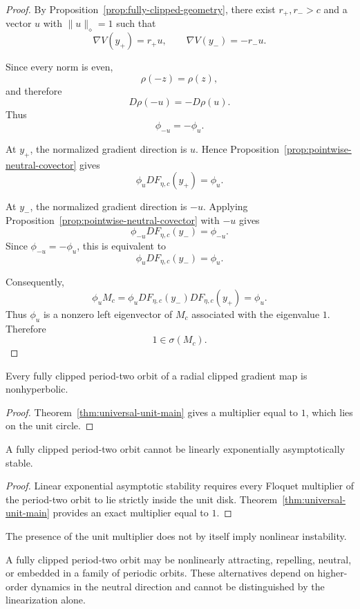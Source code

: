 \begin{proof}
By Proposition~\ref{prop:fully-clipped-geometry}, there exist
$r_+,r_->c$ and a vector $u$ with $\|u\|_\diamond=1$ such that
\[
\nabla V(y_+)=r_+u,
\qquad
\nabla V(y_-)=-r_-u.
\]

Since every norm is even,
\[
\rho(-z)=\rho(z),
\]
and therefore
\[
D\rho(-u)=-D\rho(u).
\]
Thus
\[
\phi_{-u}=-\phi_u.
\]

At $y_+$, the normalized gradient direction is $u$.
Hence Proposition~\ref{prop:pointwise-neutral-covector} gives
\[
\phi_u DF_{\eta,c}(y_+)=\phi_u.
\]

At $y_-$, the normalized gradient direction is $-u$.
Applying Proposition~\ref{prop:pointwise-neutral-covector}
with $-u$ gives
\[
\phi_{-u}DF_{\eta,c}(y_-)=\phi_{-u}.
\]
Since $\phi_{-u}=-\phi_u$, this is equivalent to
\[
\phi_uDF_{\eta,c}(y_-)=\phi_u.
\]

Consequently,
\[
\phi_uM_c
=
\phi_uDF_{\eta,c}(y_-)
DF_{\eta,c}(y_+)
=
\phi_u.
\]
Thus $\phi_u$ is a nonzero left eigenvector of $M_c$
associated with the eigenvalue $1$. Therefore
\[
1\in\sigma(M_c).
\]
\end{proof}

\begin{corollary}
\label{cor:fully-clipped-nonhyperbolic}
Every fully clipped period-two orbit of a radial clipped gradient map
is nonhyperbolic.
\end{corollary}

\begin{proof}
Theorem~\ref{thm:universal-unit-main} gives a multiplier equal to
$1$, which lies on the unit circle.
\end{proof}

\begin{corollary}
\label{cor:no-linear-exponential-attraction}
A fully clipped period-two orbit cannot be linearly exponentially
asymptotically stable.
\end{corollary}

\begin{proof}
Linear exponential asymptotic stability requires every Floquet
multiplier of the period-two orbit to lie strictly inside the unit
disk.  Theorem~\ref{thm:universal-unit-main} provides an exact
multiplier equal to $1$.
\end{proof}

\begin{remark}
\label{rem:nonhyperbolic-not-unstable}
The presence of the unit multiplier does not by itself imply
nonlinear instability.

A fully clipped period-two orbit may be nonlinearly attracting,
repelling, neutral, or embedded in a family of periodic orbits.
These alternatives depend on higher-order dynamics in the neutral
direction and cannot be distinguished by the linearization alone.
\end{remark}


